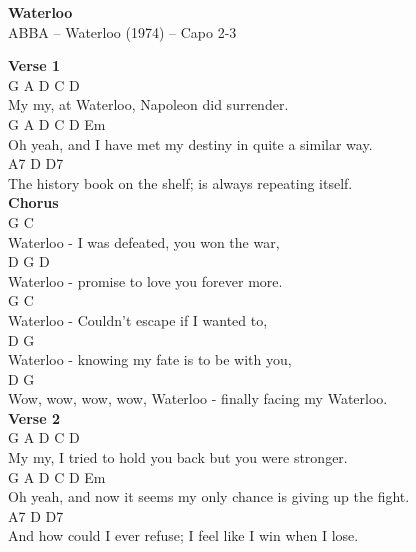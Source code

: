 \documentclass[a4paper]{article}
\begin{document}
    \begin{center}
        \textbf{Waterloo}
        ~\\
        ABBA -- Waterloo (1974)
         -- Capo 2-3
    \end{center}
    {
        \scriptsize
        \textbf{Verse 1}
        ~\\
        {
            \cutive
            \obeyspaces
   G      A           D      C      D
\\
My my, at Waterloo, Napoleon did surrender.
\\
   G         A             D   C      D               Em
\\
Oh yeah, and I have met my destiny in quite a similar way.
\\
                                  A7                 D   D7
\\
The history book on the shelf; is always repeating itself.
\\

        }
        \textbf{Chorus}
        ~\\
        {
            \cutive
            \obeyspaces
G                              C
\\
Waterloo - I was defeated, you won the war,
\\
D                                 G         D
\\
Waterloo - promise to love you forever more.
\\
G                               C
\\
Waterloo - Couldn't escape if I wanted to,
\\
D                                G
\\
Waterloo - knowing my fate is to be with you,
\\
                    D                            G
\\
Wow, wow, wow, wow, Waterloo - finally facing my Waterloo.
\\

        }
        \textbf{Verse 2}
        ~\\
        {
            \cutive
            \obeyspaces
   G     A                 D        C        D
\\
My my, I tried to hold you back but you were stronger.
\\
   G         A               D    C         D             Em
\\
Oh yeah, and now it seems my only chance is giving up the fight.
\\
                               A7                     D    D7
\\
And how could I ever refuse; I feel like I win when I lose.
\\

}}
\end{document}
